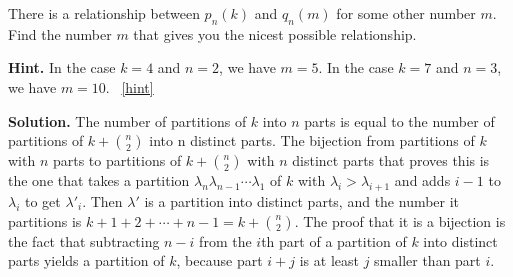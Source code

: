 \documentclass{book}
\begin{document}
\setcounter{project}{312}
\addtocounter{project}{-1}
\begin{activity}[]\label{activity-305}
\hypertarget{p-1586}{}%
There is a relationship between \(p_n(k)\) and \(q_n(m)\) for some other number \(m\). Find the number \(m\) that gives you the nicest possible relationship.%
\par\smallskip%
\noindent\textbf{Hint.}\hypertarget{hint-200}{}\quad%
\hypertarget{p-1587}{}%
In the case \(k=4\) and \(n=2\), we have \(m=5\). In the case \(k = 7\) and \(n = 3\), we have \(m = 10\).%
~\hfill{\tiny\hyperlink{a-312}{[hint]}\hypertarget{q-312}{}}\par\smallskip%
\noindent\textbf{Solution.}\hypertarget{solution-225}{}\quad%
\hypertarget{p-1588}{}%
The number of partitions of \(k\) into \(n\) parts is equal to the number of partitions of \(k+\binom{n}{2}\) into n distinct parts.  The bijection from partitions of \(k\) with \(n\) parts to partitions of \(k+\binom{n}{2}\) with \(n\) distinct parts that proves this is the one that takes a partition \(\lambda_n\lambda_{n-1}\cdots\lambda_1\) of \(k\) with \(\lambda_i>\lambda_{i+1}\) and adds \(i-1\) to \(\lambda_i\) to get \(\lambda'_i\). Then \(\lambda'\) is a partition into distinct parts, and the number it partitions is \(k+1+2+\cdots+n-1=k+\binom{n}{2}\). The proof that it is a bijection is the fact that subtracting \(n-i\) from the \(i\)\/th part of a partition of \(k\) into distinct parts yields a partition of \(k\), because part \(i+j\) is at least \(j\) smaller than part \(i\).%
\end{activity}
\end{document}
